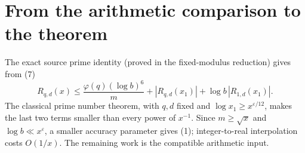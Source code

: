 \section{From the arithmetic comparison to the theorem}
The exact source prime identity (proved in the
{fixed-modulus reduction}) gives from (7)
\[
 R_{q,d}(x)\le \frac{\varphi(q)(\log b)^6}{m}
     +|R_{q,d}(x_1)|+\log b\,|R_{1,d}(x_1)|.
 \tag{8}
\]
The classical prime number theorem, with \(q,d\) fixed and
\(\log x_1\ge x^{\varepsilon/12}\), makes the last two terms
smaller than every power of \(x^{-1}\). Since \(m\ge\sqrt x\)
and \(\log b\ll x^\varepsilon\), a smaller accuracy parameter
gives (1); integer-to-real interpolation costs \(O(1/x)\).
The remaining work is the compatible arithmetic input.

